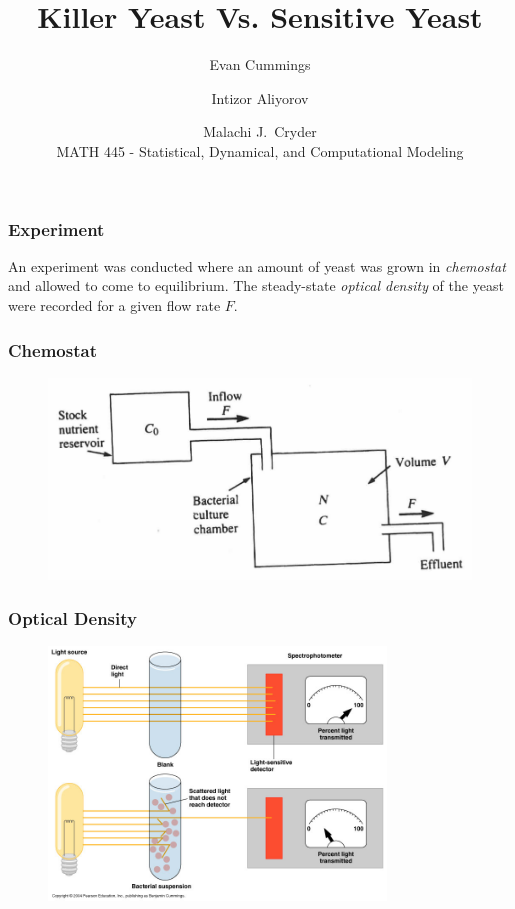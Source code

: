 \documentclass{beamer}
\title{Killer Yeast Vs. Sensitive Yeast}
\author{Evan Cummings \and Intizor Aliyorov \and Malachi J.\ Cryder\\
\vspace{5mm}
MATH 445 - Statistical, Dynamical, and Computational Modeling}
\begin{document}
\frame{\titlepage}

\begin{frame}
  \frametitle{Experiment}
  An experiment was conducted where an amount of yeast was grown in \emph{chemostat} and allowed to come to equilibrium.  The steady-state \emph{optical density} of the yeast were recorded for a given flow rate $F$.
\end{frame}

\begin{frame}
  \frametitle{Chemostat}
  \begin{figure}[H]
    \centering
      \includegraphics[width=1.0\textwidth]{images/chemostat.png}
  \end{figure}
\end{frame}

\begin{frame}
  \frametitle{Optical Density}
  \begin{figure}[H]
    \centering
      \includegraphics[width=0.8\textwidth]{images/optical_density.jpg}
  \end{figure}
\end{frame}
\end{document}
